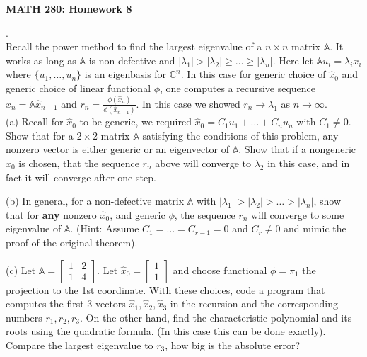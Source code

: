 \documentclass[12 pt]{article}
\begin{document}
\centerline{\bf MATH 280: Homework 8 }

\bigskip

\noindent
\medskip

. \\ Recall the power method to find the largest eigenvalue of a $n \times n$ matrix $\mathbb{A}$. It works as long as $\mathbb{A}$ is non-defective 
and $|\lambda_1| > |\lambda_2| \geq \dots \geq |\lambda_n|$. Here let $\mathbb{A} u_i = \lambda_i x_i$ where $\{ u_1, \dots, u_n \}$ is an eigenbasis for 
$\mathbb{C}^n$.
In this case for generic choice of $\hat{x}_0$ and generic choice of linear functional $\phi$, one computes a recursive sequence $\hat{x}_n = \mathbb{A} \hat{x}_{n-1}$ and $r_n = \frac{\phi(\hat{x}_{n})}{\phi(\hat{x}_{n-1})}$. In this case we showed $r_n \to \lambda_1$ as $n \to \infty$. \\

\noindent
(a) Recall for $\hat{x}_0$ to be generic, we required $\hat{x}_0=C_1 u_1 + \dots + C_n u_n$ with $C_1 \neq 0$. Show that for a $2 \times 2$ matrix $\mathbb{A}$ 
satisfying the conditions of this problem, any nonzero vector is either generic or an eigenvector of $\mathbb{A}$. Show that if a nongeneric $\hat{x}_0$ 
is chosen, that the sequence $r_n$ above will converge to $\lambda_2$ in this case, and in fact it will converge after one step.

\noindent
(b) In general, for a non-defective matrix $\mathbb{A}$ with $|\lambda_1| > |\lambda_2| > \dots > |\lambda_n|$, show that for {\bf any} nonzero $\hat{x}_0$, 
and generic $\phi$, the sequence $r_n$ will converge to some eigenvalue of $\mathbb{A}$. (Hint: Assume $C_1=\dots=C_{r-1}=0$ and $C_r \neq 0$ 
and mimic the proof of the original theorem).

\noindent
(c) Let $\mathbb{A}=\begin{bmatrix} 1 & 2 \\ 1 & 4 \end{bmatrix}$. Let $\hat{x}_0 = \begin{bmatrix} 1 \\ 1 \end{bmatrix}$ and choose functional 
$\phi=\pi_1$ the projection to the 1st coordinate. With these choices, code a program that computes the first 3 vectors $\hat{x}_1, \hat{x}_2, \hat{x}_3$ in the recursion and 
the corresponding numbers $r_1, r_2, r_3$. On the other hand, find the characteristic polynomial and its roots using the quadratic formula. (In this case this can be done exactly). Compare the largest eigenvalue to $r_3$, how big is the absolute error?
\end{document}
